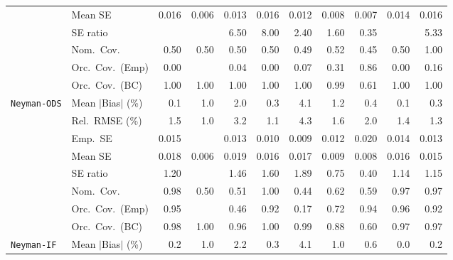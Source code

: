 \begin{landscape}
\begin{longtable}{llrrrrrrrrr}
 & Mean SE & 0.016 & 0.006 & 0.013 & 0.016 & 0.012 & 0.008 & 0.007 & 0.014 & 0.016 \\
 & SE ratio &  &  & 6.50 & 8.00 & \cellcolor{rankthree}2.40 & \cellcolor{rankone}1.60 & \cellcolor{ranktwo}0.35 &  & 5.33 \\
 & Nom.\ Cov. & \cellcolor{rankthree}0.50 & \cellcolor{rankthree}0.50 & \cellcolor{rankthree}0.50 & \cellcolor{rankthree}0.50 & 0.49 & \cellcolor{ranktwo}0.52 & 0.45 & \cellcolor{rankthree}0.50 & \cellcolor{rankone}1.00 \\
 & Orc.\ Cov.\ (Emp) & 0.00 &  & 0.04 & 0.00 & 0.07 & \cellcolor{ranktwo}0.31 & \cellcolor{rankone}0.86 & 0.00 & \cellcolor{rankthree}0.16 \\
 & Orc.\ Cov.\ (BC) & \cellcolor{rankone}1.00 & \cellcolor{rankone}1.00 & \cellcolor{rankone}1.00 & \cellcolor{rankone}1.00 & \cellcolor{rankone}1.00 & \cellcolor{rankone}0.99 & \cellcolor{ranktwo}0.61 & \cellcolor{rankone}1.00 & \cellcolor{rankone}1.00 \\
\addlinespace[2pt]
\quad \texttt{Neyman-ODS} & Mean $|$Bias$|$ (\%) & \cellcolor{rankone}0.1 & 1.0 & 2.0 & \cellcolor{ranktwo}0.3 & 4.1 & 1.2 & \cellcolor{rankthree}0.4 & \cellcolor{rankone}0.1 & \cellcolor{ranktwo}0.3 \\
 & Rel.\ RMSE (\%) & 1.5 & \cellcolor{rankone}1.0 & 3.2 & \cellcolor{ranktwo}1.1 & 4.3 & 1.6 & 2.0 & 1.4 & \cellcolor{rankthree}1.3 \\
 & Emp.\ SE & 0.015 &  & 0.013 & 0.010 & 0.009 & 0.012 & 0.020 & 0.014 & 0.013 \\
 & Mean SE & 0.018 & 0.006 & 0.019 & 0.016 & 0.017 & 0.009 & 0.008 & 0.016 & 0.015 \\
 & SE ratio & \cellcolor{rankthree}1.20 &  & 1.46 & 1.60 & 1.89 & 0.75 & 0.40 & \cellcolor{rankone}1.14 & \cellcolor{ranktwo}1.15 \\
 & Nom.\ Cov. & \cellcolor{ranktwo}0.98 & 0.50 & 0.51 & \cellcolor{rankthree}1.00 & 0.44 & 0.62 & 0.59 & \cellcolor{rankone}0.97 & \cellcolor{rankone}0.97 \\
 & Orc.\ Cov.\ (Emp) & \cellcolor{rankone}0.95 &  & 0.46 & \cellcolor{rankthree}0.92 & 0.17 & 0.72 & \cellcolor{ranktwo}0.94 & \cellcolor{ranktwo}0.96 & \cellcolor{rankthree}0.92 \\
 & Orc.\ Cov.\ (BC) & \cellcolor{rankthree}0.98 & 1.00 & \cellcolor{rankone}0.96 & 1.00 & 0.99 & 0.88 & 0.60 & \cellcolor{ranktwo}0.97 & \cellcolor{ranktwo}0.97 \\
\addlinespace[2pt]
\quad \texttt{Neyman-IF} & Mean $|$Bias$|$ (\%) & \cellcolor{ranktwo}0.2 & 1.0 & 2.2 & \cellcolor{rankthree}0.3 & 4.1 & 1.0 & 0.6 & \cellcolor{rankone}0.0 & \cellcolor{ranktwo}0.2 \\

\end{longtable}
\end{landscape}
